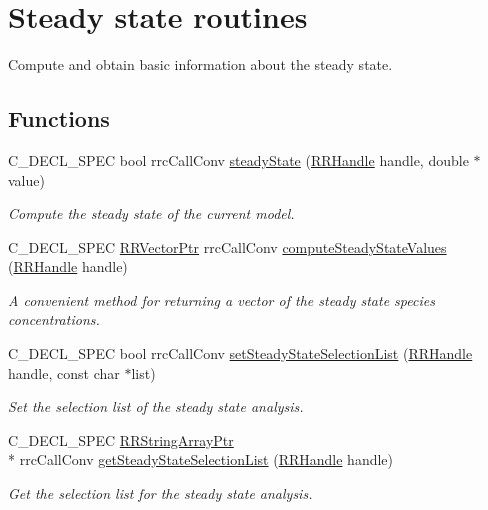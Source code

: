\hypertarget{group__steadystate}{\section{Steady state routines}
\label{group__steadystate}
}


Compute and obtain basic information about the steady state.  


\subsection*{Functions}
\begin{DoxyCompactItemize}
\item 
C\-\_\-\-D\-E\-C\-L\-\_\-\-S\-P\-E\-C bool rrc\-Call\-Conv \hyperlink{group__steadystate_gab1db24cab922136cc3a6a57b4bfbf80a}{steady\-State} (\hyperlink{rrc__types_8h_a1d68f0592372208fa5a5f2799ea4b3ae}{R\-R\-Handle} handle, double $\ast$value)
\begin{DoxyCompactList}\small\item\em Compute the steady state of the current model. \end{DoxyCompactList}\item 
C\-\_\-\-D\-E\-C\-L\-\_\-\-S\-P\-E\-C \hyperlink{rrc__types_8h_a3be72d6006034fd349f753d2bf441bf7}{R\-R\-Vector\-Ptr} rrc\-Call\-Conv \hyperlink{group__steadystate_ga808060f5094396e4697434eb5a41f14f}{compute\-Steady\-State\-Values} (\hyperlink{rrc__types_8h_a1d68f0592372208fa5a5f2799ea4b3ae}{R\-R\-Handle} handle)
\begin{DoxyCompactList}\small\item\em A convenient method for returning a vector of the steady state species concentrations. \end{DoxyCompactList}\item 
C\-\_\-\-D\-E\-C\-L\-\_\-\-S\-P\-E\-C bool rrc\-Call\-Conv \hyperlink{group__steadystate_gaff273d8a9038c411779b206bf58d71eb}{set\-Steady\-State\-Selection\-List} (\hyperlink{rrc__types_8h_a1d68f0592372208fa5a5f2799ea4b3ae}{R\-R\-Handle} handle, const char $\ast$list)
\begin{DoxyCompactList}\small\item\em Set the selection list of the steady state analysis. \end{DoxyCompactList}\item 
C\-\_\-\-D\-E\-C\-L\-\_\-\-S\-P\-E\-C \hyperlink{rrc__types_8h_a7c9475df6c7337d99482b13a365e7596}{R\-R\-String\-Array\-Ptr} \\*
rrc\-Call\-Conv \hyperlink{group__steadystate_gaadc456216e3ed8cd9f75c15ac1685616}{get\-Steady\-State\-Selection\-List} (\hyperlink{rrc__types_8h_a1d68f0592372208fa5a5f2799ea4b3ae}{R\-R\-Handle} handle)
\begin{DoxyCompactList}\small\item\em Get the selection list for the steady state analysis. \end{DoxyCompactList}\end{DoxyCompactItemize}



